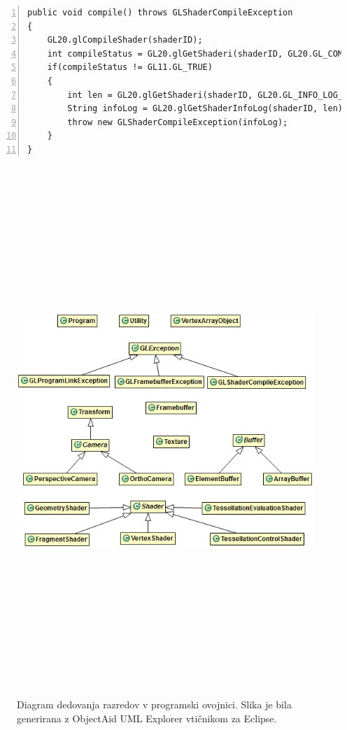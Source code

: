 \documentclass[a4paper, 12pt]{book}
\begin{document}
{
\renewcommand{\lstlistingname}{Odsek kode}
\footnotesize
\begin{lstlisting}[captionpos=b, frame=single, caption={Funkcija za prevajanje senčilnikov s preverjanjem za napake.}, breaklines=true, firstline=1, numbers=left, tabsize=4, label=compilefunction]
public void compile() throws GLShaderCompileException
{
	GL20.glCompileShader(shaderID);
	int compileStatus = GL20.glGetShaderi(shaderID, GL20.GL_COMPILE_STATUS);
	if(compileStatus != GL11.GL_TRUE)
	{
		int len = GL20.glGetShaderi(shaderID, GL20.GL_INFO_LOG_LENGTH);
		String infoLog = GL20.glGetShaderInfoLog(shaderID, len);
		throw new GLShaderCompileException(infoLog);
	}
}
\end{lstlisting}}

\begin{figure}[h!]
\begin{center}
\includegraphics[width=\textwidth, height=20cm, keepaspectratio=true]{class_diagram.png}
\end{center}
\caption{Diagram dedovanja razredov v programski ovojnici. Slika je bila generirana z ObjectAid UML Explorer\cite{objectaid} vtičnikom za Eclipse.}
\label{classdiagram}
\end{figure}
\end{document}
